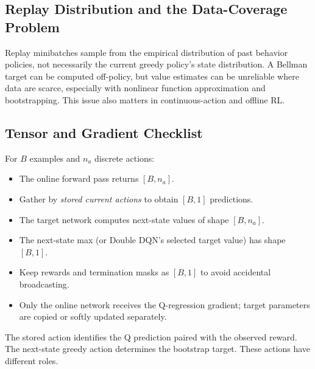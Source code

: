 \subsection{Replay Distribution and the Data-Coverage Problem}
Replay minibatches sample from the empirical distribution of past behavior policies, not necessarily the current greedy policy's state distribution. A Bellman target can be computed off-policy, but value estimates can be unreliable where data are scarce, especially with nonlinear function approximation and bootstrapping. This issue also matters in continuous-action and offline RL.

\subsection{Tensor and Gradient Checklist}
For $B$ examples and $n_a$ discrete actions:
\begin{itemize}
\item The online forward pass returns $[B,n_a]$.
\item Gather by \emph{stored current actions} to obtain $[B,1]$ predictions.
\item The target network computes next-state values of shape $[B,n_a]$.
\item The next-state max (or Double DQN's selected target value) has shape $[B,1]$.
\item Keep rewards and termination masks as $[B,1]$ to avoid accidental broadcasting.
\item Only the online network receives the Q-regression gradient; target parameters are copied or softly updated separately.
\end{itemize}
\begin{pitfall}
The stored action identifies the Q prediction paired with the observed reward. The next-state greedy action determines the bootstrap target. These actions have different roles.
\end{pitfall}

